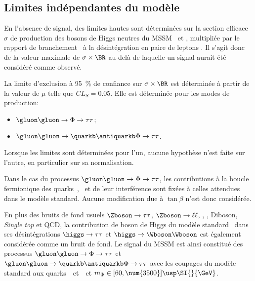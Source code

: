 \subsection{Limites indépendantes du modèle}\label{chapter-HTT_analysis-section-signal_extraction-model_indep_and_likelihood}
En l'absence de signal, des limites hautes sont déterminées sur la section efficace $\sigma$ de production des bosons de Higgs neutres du MSSM \Higgs\ et \HiggsA, multipliée par le rapport de branchement \BR\ à la désintégration en paire de leptons \tau.
Il s'agit donc de la valeur maximale de $\sigma\times\BR$ au-delà de laquelle un signal aurait été considéré comme observé.
\par
La limite d'exclusion à \SI{95}{\%} de confiance sur $\sigma\times\BR$ est déterminée à partir de la valeur de $\mu$ telle que $CL_S = \num{0.05}$.
Elle est déterminée pour les modes de production:
\begin{itemize}
\item $\gluon\gluon\to\Phi\to\tau\tau$;
\item $\gluon\gluon\to\quarkb\antiquarkb\Phi\to\tau\tau$.
\end{itemize}
Lorsque les limites sont déterminées pour l'un, aucune hypothèse n'est faite sur l'autre, en particulier sur sa normalisation.
\par
Dans le cas du processus $\gluon\gluon\to\Phi\to\tau\tau$, les contributions à la boucle fermionique des quarks~\quarkt, \quarkb\ et de leur interférence sont fixées à celles attendues dans le modèle standard.
Aucune modification due à $\tan\beta$ n'est donc considérée.
\par
En plus des bruits de fond usuels
$\Zboson\to\tau\tau$,
$\Zboson\to\ell\ell$,
\Wjets,
\ttbar,
Diboson, \emph{Single top}
et
QCD,
la contribution de boson de Higgs du modèle standard \higgs\ dans ses désintégrations
$\higgs\to\tau\tau$
et
$\higgs\to\Wboson\Wboson$
est également considérée comme un bruit de fond.
Le signal du MSSM est ainsi constitué des processus
$\gluon\gluon\to\Phi\to\tau\tau$
et
$\gluon\gluon\to\quarkb\antiquarkb\Phi\to\tau\tau$
avec les coupages du modèle standard aux quarks~\quarkt\ et~\quarkb\
et $m_\Phi\in[60, \num{3500}]\usp\SI{}{\GeV}$.